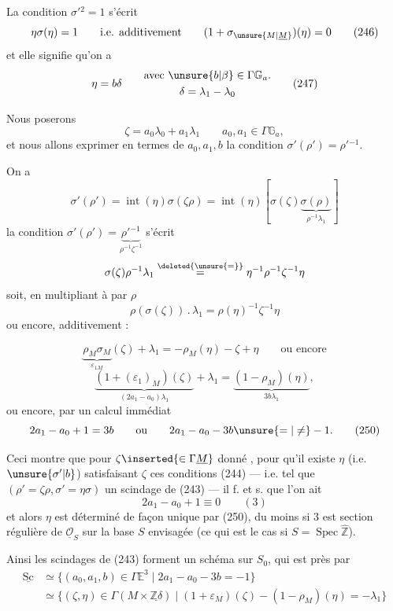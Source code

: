 La condition $\sigma'{}^2=1$ s'écrit
\[
\eta\sigma(\eta)=1
\qquad\text{i.e. additivement}\qquad
(1+\sigma_{\unsure{M|\underline M}})(\eta)=0
\tag{246}
\]
et elle signifie qu'on a
\[
\eta=b\delta\qquad
\begin{gathered}
\text{avec }\unsure{b|\beta}\in\Gamma\mathbb G_a.\\
\delta=\lambda_1-\lambda_0
\end{gathered}
\tag{247}
\]

Nous poserons
\[
\zeta=a_0\lambda_0+a_1\lambda_1
\qquad a_0,a_1\in\Gamma\mathbb G_a,
\tag{248}
\]
et nous allons exprimer en termes de $a_0,a_1,b$ la condition
$\sigma'(\rho')=\rho'{}^{-1}$.

On a
\[
\sigma'(\rho')=\operatorname{int}(\eta)\sigma(\zeta\rho)
=\operatorname{int}(\eta)
\left[\sigma(\zeta)\underbrace{\sigma(\rho)}_{\rho^{-1}\lambda_1}\right]
\]
la condition
$\sigma'(\rho')=\underbrace{\rho'{}^{-1}}_{\rho^{-1}\zeta^{-1}}$
s'écrit
\[
\sigma(\zeta)\rho^{-1}\lambda_1
\overset{\deleted{\unsure{=}}}{=}
\eta^{-1}\rho^{-1}\zeta^{-1}\eta
\]
soit, en multipliant à  par $\rho$
\[
\rho(\sigma(\zeta))\mathbin{.}\lambda_1
=\rho(\eta)^{-1}\zeta^{-1}\eta
\]
ou encore, additivement :


\[
\underbrace{\rho_M\sigma_M}_{\varepsilon_{1M}}(\zeta)+\lambda_1
=-\rho_M(\eta)-\zeta+\eta
\qquad\text{ou encore}
\]
\[
\underbrace{(1+(\varepsilon_1)_M)(\zeta)}_{(2a_1-a_0)\lambda_1}
+\lambda_1
=\underbrace{(1-\rho_M)(\eta)}_{3b\lambda_1},
\tag{249}
\]
ou encore, par un calcul immédiat
\[
2a_1-a_0+1=3b
\qquad\text{ou}\qquad
2a_1-a_0-3b\unsure{=|\ne}-1.
\tag{250}
\]

Ceci montre que pour $\zeta\inserted{\in\Gamma\underline M}$ donné
, pour qu'il existe $\eta$
(i.e. $\unsure{\sigma'|b}$) satisfaisant  $\zeta$ ces
conditions (244) --- i.e.  tel que
$(\rho'=\zeta\rho,\sigma'=\eta\sigma)$  un scindage de
(243) --- il f. et s. que l'on ait
\[
2a_1-a_0+1\equiv0\qquad(3)
\tag{251}
\]
et alors $\eta$ est déterminé de façon unique par (250), du moins si $3$ est
section régulière de $\underline{\mathcal O}_S$ sur la base $S$
envisagée (ce qui est le cas si $S=\operatorname{Spec}\widehat{\mathbb Z}$).

Ainsi les scindages de (243) forment un schéma
 sur $S_0$, qui est
  près par
\[
\begin{aligned}
\underline{\mathrm{Sc}}
&\simeq
\{(a_0,a_1,b)\in\Gamma\mathbb E^3
  \mid 2a_1-a_0-3b=-1\}\\
&\simeq
\{(\zeta,\eta)\in\Gamma(M\times\underline{\mathbb Z\delta})
  \mid(1+\varepsilon_{M})(\zeta)
       -(1-\rho_M)(\eta)=-\lambda_1\}
\end{aligned}
\tag{252}
\]

